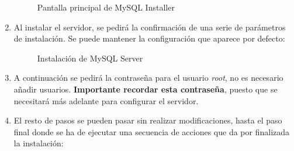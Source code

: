 \begin{enumerate}
\begin{figure} [!htb]
		\caption{Pantalla principal de MySQL Installer}
		\label{fig:mySQLInstallerMain}
	\end{figure}
	\FloatBarrier
	\item Al instalar el servidor, se pedirá la confirmación de una serie de parámetros de instalación. Se puede mantener la configuración que aparece por defecto:
	\begin{figure} [!htb]
		\centering
		\caption{Instalación de MySQL Server}
		\label{fig:mySQLInstallerServer_1}
	\end{figure}
	\FloatBarrier
	\item A continuación se pedirá la contraseña para el usuario \emph{root}, no es necesario añadir usuarios. \textbf{Importante recordar esta contraseña}, puesto que se necesitará más adelante para configurar el servidor.
	\item El resto de pasos se pueden pasar sin realizar modificaciones, hasta el paso final donde se ha de ejecutar una secuencia de acciones que da por finalizada la instalación:
	\begin{figure} [!htb]
		\centering

\end{figure}
\end{enumerate}
